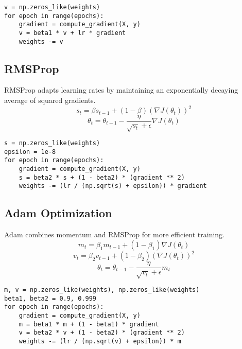 \begin{verbatim}
v = np.zeros_like(weights)
for epoch in range(epochs):
    gradient = compute_gradient(X, y)
    v = beta1 * v + lr * gradient
    weights -= v
\end{verbatim}

\subsection{RMSProp}
RMSProp adapts learning rates by maintaining an exponentially decaying average of squared gradients.
\begin{equation}
s_t = \beta s_{t-1} + (1 - \beta) (\nabla J(\theta_t))^2
\end{equation}
\begin{equation}
\theta_t = \theta_{t-1} - \frac{\eta}{\sqrt{s_t} + \epsilon} \nabla J(\theta_t)
\end{equation}

\begin{verbatim}
s = np.zeros_like(weights)
epsilon = 1e-8
for epoch in range(epochs):
    gradient = compute_gradient(X, y)
    s = beta2 * s + (1 - beta2) * (gradient ** 2)
    weights -= (lr / (np.sqrt(s) + epsilon)) * gradient
\end{verbatim}

\subsection{Adam Optimization}
Adam combines momentum and RMSProp for more efficient training.
\begin{equation}
m_t = \beta_1 m_{t-1} + (1 - \beta_1) \nabla J(\theta_t)
\end{equation}
\begin{equation}
v_t = \beta_2 v_{t-1} + (1 - \beta_2) (\nabla J(\theta_t))^2
\end{equation}
\begin{equation}
\theta_t = \theta_{t-1} - \frac{\eta}{\sqrt{v_t} + \epsilon} m_t
\end{equation}

\begin{verbatim}
m, v = np.zeros_like(weights), np.zeros_like(weights)
beta1, beta2 = 0.9, 0.999
for epoch in range(epochs):
    gradient = compute_gradient(X, y)
    m = beta1 * m + (1 - beta1) * gradient
    v = beta2 * v + (1 - beta2) * (gradient ** 2)
    weights -= (lr / (np.sqrt(v) + epsilon)) * m
\end{verbatim}

